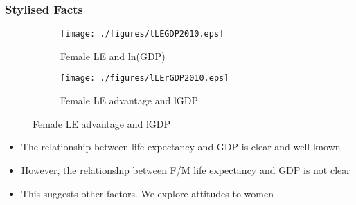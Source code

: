 \documentclass[10pt,letterpaper,subeqn]{beamer}
\begin{document}
\begin{frame}[label=CC1]
\frametitle{Stylised Facts}
\begin{figure}[htpb!]
\centering
\begin{subfigure}{.5\textwidth}
  \centering
  \texttt{[image: ./figures/lLEGDP2010.eps]}
  \caption{Female LE and ln(GDP)}
  \label{TWINfig:fertrend}
\end{subfigure}%
\begin{subfigure}{.5\textwidth}
  \centering
  \texttt{[image: ./figures/lLErGDP2010.eps]}
  \caption{Female LE advantage and lGDP}
  \label{TWINfig:eductrend}
\end{subfigure}
\end{figure}
\begin{itemize}
\item The relationship between life expectancy and GDP is clear and well-known
\item However, the relationship between F/M life expectancy and GDP is not clear
\item This suggests other factors.  We explore attitudes to women
\end{itemize}
\end{frame}


%
\end{document}
